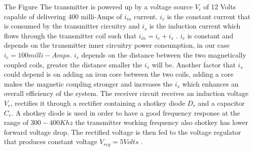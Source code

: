 
The Figure %
The transmitter is powered up by a voltage source $V_i$ of 12 Volts capable of delivering 400 milli-Amps of $i_{in}$ current. $i_c$ is the constant current that is consumed by the transmitter circuitry and $i_s$ is the induction current which flows through the transmitter coil such that $i_{in} = i_c + i_s$ . $i_c$ is constant and depends on the transmitter inner circuitry power consumption, in our case $i_c = 100 milli-Amps $. $i_s$ depends on the distance between the two magnetically coupled coils, greater the distance smaller the $i_s$ will be. Another factor that $i_s$ could depend is on adding an iron core between the two coils, adding a core makes the magnetic coupling stronger and increases the $i_s$ which enhances an overall efficiency of the system.
The receiver circuit receives an induction voltage $V_r$, rectifies it through a rectifier containing a shotkey diode $D_r$ and a capacitor $C_r$. A shotkey diode is used in order to have a good frequency response at the range of $ 300-400 Khz$ the transmitter working frequency also shotkey has lower forward voltage drop. The rectified voltage is then fed to the voltage regulator that produces constant voltage $V_{reg} = 5 Volts$ .
